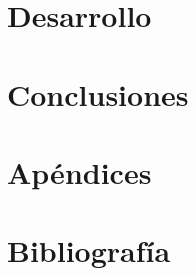 \documentclass[12pt,a4paper]{book} %
\begin{document}








\part{Desarrollo}
\label{sec:desarrollo}


\part{Conclusiones}



\part{Apéndices}

\appendix







\part{Bibliografía}



%

\backmatter

%

%
\end{document}
